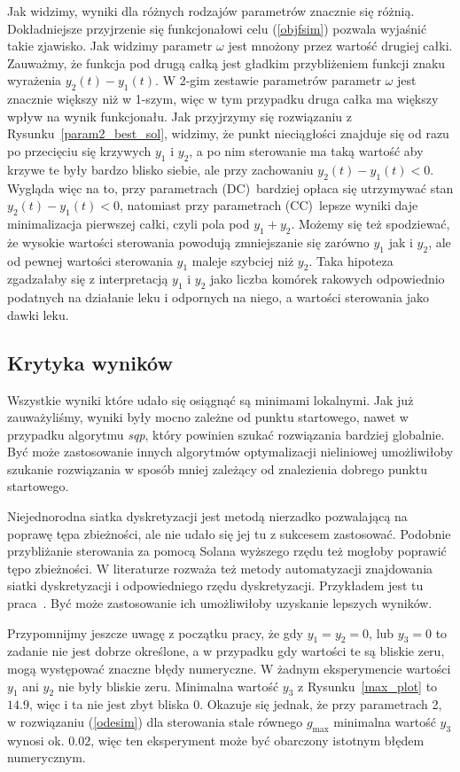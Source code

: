 \documentclass[11pt]{article}
\begin{document}
Jak widzimy, wyniki dla różnych rodzajów parametrów znacznie się różnią. Dokładniejsze przyjrzenie się funkcjonałowi celu (\ref{objfsim}) pozwala wyjaśnić takie zjawisko. Jak widzimy parametr $\omega$ jest mnożony przez wartość drugiej całki. Zauważmy, że funkcja pod drugą całką jest gładkim przybliżeniem funkcji znaku wyrażenia $y_2(t) - y_1(t)$. W 2-gim zestawie parametrów parametr $\omega$ jest znacznie większy niż w 1-szym, więc w tym przypadku druga całka ma większy wpływ na wynik funkcjonału. Jak przyjrzymy się rozwiązaniu z Rysunku~\ref{param2_best_sol}, widzimy, że punkt nieciągłości znajduje się od razu po przecięciu się krzywych $y_1$ i $y_2$, a po nim sterowanie ma taką wartość aby krzywe te były bardzo blisko siebie, ale przy zachowaniu $y_2(t) - y_1(t) < 0$. Wygląda więc na to, przy parametrach (DC)\ bardziej opłaca się utrzymywać stan $y_2(t) - y_1(t) < 0$, natomiast przy parametrach (CC)\ lepsze wyniki daje minimalizacja pierwszej całki, czyli pola pod $y_1 + y_2$. Możemy się też spodziewać, że wysokie wartości sterowania powodują zmniejszanie się zarówno $y_1$ jak i $y_2$, ale od pewnej wartości sterowania $y_1$ maleje szybciej niż $y_2$. Taka hipoteza zgadzałaby się z interpretacją $y_1$ i $y_2$ jako liczba komórek rakowych odpowiednio podatnych na działanie leku i odpornych na niego, a wartości sterowania jako dawki leku.

\subsection{Krytyka wyników}
Wszystkie wyniki które udało się osiągnąć są minimami lokalnymi. Jak już zauważyliśmy, wyniki były mocno zależne od punktu startowego, nawet w przypadku algorytmu {\it sqp}, który powinien szukać rozwiązania bardziej globalnie. Być może zastosowanie innych algorytmów optymalizacji nieliniowej umożliwiłoby szukanie rozwiązania w sposób mniej zależący od znalezienia dobrego punktu startowego.

Niejednorodna siatka dyskretyzacji jest metodą nierzadko pozwalającą na poprawę tępa zbieżności, ale nie udało się jej tu z sukcesem zastosować. Podobnie przybliżanie sterowania za pomocą Solana wyższego rzędu też mogłoby poprawić tępo zbieżności. W literaturze rozważa też metody automatyzacji znajdowania siatki dyskretyzacji i odpowiedniego rzędu dyskretyzacji. Przykładem jest tu praca~\cite{Rao-ph}. Być może zastosowanie ich umożliwiłoby uzyskanie lepszych wyników.

Przypomnijmy jeszcze uwagę z początku pracy, że gdy $y_1 = y_2 = 0$, lub $y_3 = 0$ to zadanie nie jest dobrze określone, a w przypadku gdy wartości te są bliskie zeru, mogą występować znaczne błędy numeryczne. W żadnym eksperymencie wartości $y_1$ ani $y_2$ nie były bliskie zeru. Minimalna wartość $y_3$ z Rysunku~\ref{max_plot} to $14.9$, więc i ta nie jest zbyt bliska 0. Okazuje się jednak, że przy parametrach 2, w rozwiązaniu (\ref{odesim}) dla sterowania stale równego $g_{\max}$ minimalna wartość $y_3$ wynosi ok. $0.02$, więc ten eksperyment może być obarczony istotnym błędem numerycznym.

\newpage{}
{}

\end{document}
